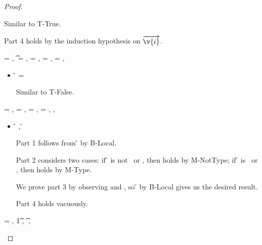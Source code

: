 \begin{lemma}
\begin{proof}
\begin{case}[T-Instance]
\begin{itemize}
\begin{subcase}[B-Val]
        Similar to T-True.

        Part 4 holds by the induction hypothesis on ${\overrightarrow{\v{i}}}$.
      \end{subcase}
  \end{itemize}
\end{case}


\begin{case}[T-Nil]
\e{} = \nil, \t{} = \Nil, \thenprop{\prop{}} = \botprop{}, \elseprop{\prop{}} = \topprop{}, \object{} = \emptyobject{},

\begin{itemize}
  \item[] 
    \begin{subcase}[B-Val] 
      \v{} = \nil{}

      Similar to T-False.
\end{subcase}

\end{itemize}

\end{case}

\begin{case}[T-Local]
  \e{} = \x{}, \thenprop{\prop{}} = {\notprop {\falsy{}} {\x{}}},
  \elseprop{\prop{}} = {\isprop {\falsy{}} {\x{}}},
\object{} = \x{}, 
\inpropenv{\propenv{}}{\isprop{\t{}}{\x{}}},

\begin{itemize}
  \item[]
\begin{subcase}[B-Local]
{ \inopenv {\openv{}} {\x{}} {\v{}} },
{ \opsem {\openv{}} {\x{}} {\v{}} }

Part 1 follows from \inopenv{\openv{}}{\x{}} {\v{}} by B-Local.

Part 2 considers two cases: if \v{} is not \false\ or \nil, then 
\satisfies{\openv{}}{\notprop{\falsy}{\x{}}} holds by M-NotType; if \v{} is \false\ or \nil, then 
\satisfies{\openv{}}{\isprop{\falsy}{\x{}}} holds by M-Type.

We prove part 3 by observing
\inpropenv{\propenv{}}{\isprop{\t{}}{\x{}}}
and
\satisfies{\openv{}}{\propenv{}},
so
{ \inopenv {\openv{}} {\x{}} {\v{}} }
by B-Local
gives us the desired result.

Part 4 holds vacuously.
\end{subcase}
\end{itemize}

\end{case}

\begin{case}[T-Do]
\e{} = { {}},
  \judgement {\propenv{}} 
             { {\t1}} 
             { {}} 
             {},
           { {\t{}}} 
           {\filterset {\thenprop {\prop{}}} {\elseprop {\prop{}}}} 
           {\object{}},


\end{case}
\end{proof}
\end{lemma}

